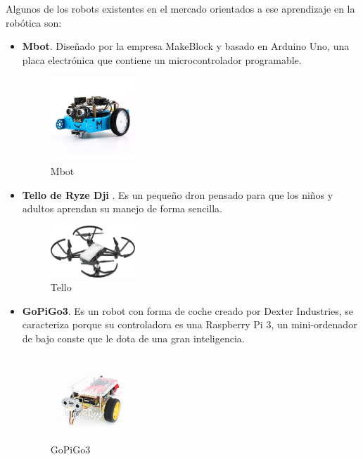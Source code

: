 \documentclass{report}
\begin{document}
Algunos de los robots existentes en el mercado orientados a ese aprendizaje en la robótica son:
\begin{itemize}
	\item \textbf{Mbot}. Diseñado por la empresa MakeBlock y basado en Arduino Uno, una placa electrónica que contiene un microcontrolador programable.
		\begin{figure}[h!]
  			\centering
   			 \includegraphics[width=0.3\textwidth]{images/mbot.png}
 			 \caption{Mbot}
 			 \label{Mbot}
		\end{figure}
	\item \textbf{Tello de Ryze Dji }. Es un pequeño dron pensado para que los niños y adultos aprendan su manejo de forma sencilla.
		\begin{figure}[h!]
  			\centering
   			 \includegraphics[width=0.3\textwidth]{images/tello.png}
 			 \caption{Tello}
 			 \label{Tello}
		\end{figure}
	\item \textbf{GoPiGo3}. Es un robot con forma de coche creado por Dexter Industries, se caracteriza porque su controladora es una Raspberry Pi 3, un mini-ordenador de bajo conste que le dota de una gran inteligencia.
		\begin{figure}[h!]
  			\centering
   			 \includegraphics[width=0.3\textwidth]{images/GoPiGo.png}
 			 \caption{GoPiGo3}
 			 \label{GoPiGo3}
		\end{figure}
\end{itemize}
\end{document}
